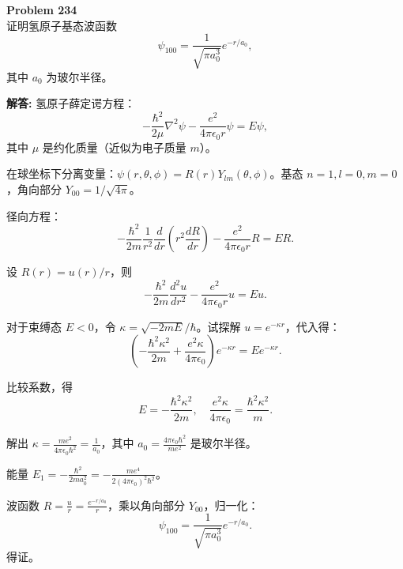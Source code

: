 \documentclass[12pt, a4paper, oneside]{ctexart}
\newenvironment{solution}{\par\noindent\textbf{解答:}\quad}{\par}
\begin{document}
\begin{mdframed}[backgroundcolor=gray!10, linewidth=0pt]
    \textbf{Problem 234} \\
    证明氢原子基态波函数
    \[
    \psi_{100} = \frac{1}{\sqrt{\pi a_0^3}} e^{-r/a_0},
    \]
    其中 $a_0$ 为玻尔半径。
\end{mdframed}
\begin{solution}
    氢原子薛定谔方程：
    \[
    -\frac{\hbar^2}{2\mu} \nabla^2 \psi - \frac{e^2}{4\pi\epsilon_0 r} \psi = E \psi,
    \]
    其中 $\mu$ 是约化质量（近似为电子质量 $m$）。
    
    在球坐标下分离变量：$\psi(r,\theta,\phi) = R(r) Y_{lm}(\theta,\phi)$。基态 $n=1, l=0, m=0$，角向部分 $Y_{00} = 1/\sqrt{4\pi}$。
    
    径向方程：
    \[
    -\frac{\hbar^2}{2m} \frac{1}{r^2} \frac{d}{dr} \left( r^2 \frac{dR}{dr} \right) - \frac{e^2}{4\pi\epsilon_0 r} R = E R.
    \]
    
    设 $R(r) = u(r)/r$，则
    \[
    -\frac{\hbar^2}{2m} \frac{d^2 u}{dr^2} - \frac{e^2}{4\pi\epsilon_0 r} u = E u.
    \]
    
    对于束缚态 $E<0$，令 $\kappa = \sqrt{-2mE}/\hbar$。试探解 $u = e^{-\kappa r}$，代入得：
    \[
    \left( -\frac{\hbar^2 \kappa^2}{2m} + \frac{e^2 \kappa}{4\pi\epsilon_0} \right) e^{-\kappa r} = E e^{-\kappa r}.
    \]
    
    比较系数，得
    \[
    E = -\frac{\hbar^2 \kappa^2}{2m}, \quad \frac{e^2 \kappa}{4\pi\epsilon_0} = \frac{\hbar^2 \kappa^2}{m}.
    \]
    
    解出 $\kappa = \frac{m e^2}{4\pi\epsilon_0 \hbar^2} = \frac{1}{a_0}$，其中 $a_0 = \frac{4\pi\epsilon_0 \hbar^2}{m e^2}$ 是玻尔半径。
    
    能量 $E_1 = -\frac{\hbar^2}{2m a_0^2} = -\frac{m e^4}{2(4\pi\epsilon_0)^2 \hbar^2}$。
    
    波函数 $R = \frac{u}{r} = \frac{e^{-r/a_0}}{r}$，乘以角向部分 $Y_{00}$，归一化：
    \[
    \psi_{100} = \frac{1}{\sqrt{\pi a_0^3}} e^{-r/a_0}.
    \]
    得证。
\end{solution}
\end{document}
